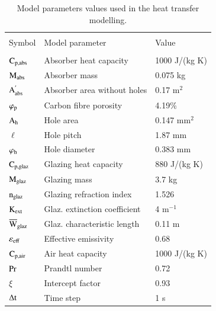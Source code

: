 \begin{table}[!ht]
	\caption{Model parameters values used in the heat transfer modelling.}
	\centering
\begin{tabular}{p{1.75cm}p{5.5cm}p{2.5cm}}
	\hline \\[-10pt]
	Symbol & Model parameter & Value \\ [2pt]
	 \hline \\[-12pt]
	$\rm{C_{p,abs}}$ & Absorber heat capacity & 1000 J/(kg K) \\ [2pt]
	
	$\rm{M_{abs}}$ & Absorber mass & 0.075 kg \\ [2pt]
	
	$\rm{A_{abs}^{'}}$ & Absorber area without holes & 0.17 m$^2$ \\ [2pt]
	
	$\varphi_{\rm{p}}$ & Carbon fibre porosity & 4.19\% \\ [2pt]
	
	$\rm{A_h}$ & Hole area & 0.147 mm$^2$ \\ [2pt]
	
	$\ell$ & Hole pitch & 1.87 mm \\ [2pt]
	
	$\varphi_{\rm{h}}$ & Hole diameter & 0.383 mm \\ [2pt]
 
	$\rm{C_{p,glaz}}$ & Glazing heat capacity & 880 J/(kg K) \\ [2pt]
 
	$\rm{M_{glaz}}$ & Glazing mass & 3.7 kg \\ [2pt]
	
    $\rm{n_{glaz}}$ & Glazing refraction index & 1.526 \\ [2pt]
 
	$\rm{K_{ext}}$ & Glaz. extinction coefficient & 4 m$^{-1}$ \\ [2pt]
	
	$\rm{{\overline W}_{glaz}}$ & Glaz. characteristic length & 0.11 m \\ [2pt]
	

	$\varepsilon_{\rm{eff}}$ & Effective emissivity & 0.68 \\ [2pt]

	$\rm{C_{p,air}}$ & Air heat capacity & 1000 J/(kg K) \\ [2pt]
 
	$\rm{Pr}$ & Prandtl number & 0.72 \\ [2pt]

	$\xi$ & Intercept factor & 0.93 \\ [2pt]
 
	$\Delta {\rm{t}}$ & Time step & 1 s \\ 
	\hline 
\end{tabular}
	\label{model_parameters}
\end{table}

